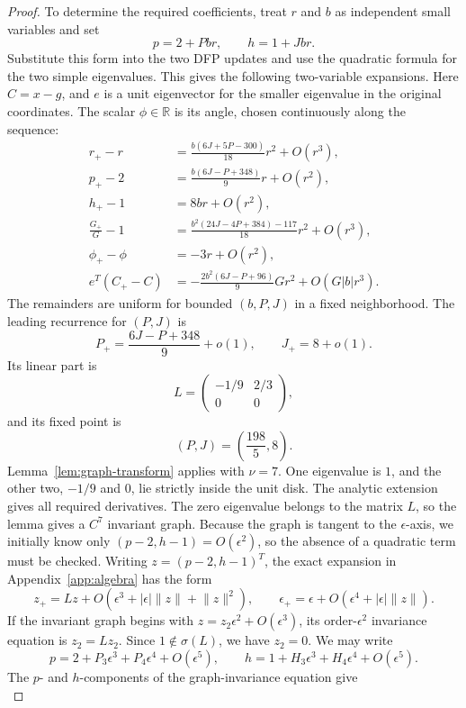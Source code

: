 \documentclass[11pt]{article}
\newcommand{\R}{\mathbb R}
\newcommand{\norm}[1]{\lVert #1\rVert}
\begin{document}
\begin{proof}
To determine the required coefficients, treat $r$ and $b$ as independent
small variables and set
\[
p=2+Pb r,\qquad h=1+Jb r.
\]
Substitute this form into the two DFP updates and use the quadratic formula for
the two simple eigenvalues.  This gives the following two-variable expansions.
Here $C=x-g$, and $e$ is a unit eigenvector for the smaller eigenvalue in the
original coordinates.  The scalar $\phi\in\R$ is its angle, chosen continuously
along the sequence:
\begin{align*}
r_+-r
 &=\frac{b(6J+5P-300)}{18}r^2+O(r^3),\\
p_+-2
 &=\frac{b(6J-P+348)}9r+O(r^2),\\
h_+-1&=8br+O(r^2),\\
\frac{G_+}{G}-1
 &=\frac{b^2(24J-4P+384)-117}{18}r^2+O(r^3),\\
\phi_+-\phi&=-3r+O(r^2),\\
e^T(C_+-C)
 &=-\frac{2b^2(6J-P+96)}9Gr^2+O(G|b|r^3).
\end{align*}
The remainders are uniform for bounded $(b,P,J)$ in a fixed neighborhood.
The leading recurrence for $(P,J)$ is
\begin{equation}\label{eq:transverse-map}
P_+=\frac{6J-P+348}{9}+o(1),
\qquad J_+=8+o(1).
\end{equation}
Its linear part is
\[
L=\begin{pmatrix}-1/9&2/3\\0&0\end{pmatrix},
\]
and its fixed point is
\[
(P,J)=\left(\frac{198}{5},8\right).
\]
Lemma~\ref{lem:graph-transform} applies with $\nu=7$.  One eigenvalue is $1$,
and the other two, $-1/9$ and $0$, lie strictly inside the unit disk.  The
analytic extension gives all required derivatives.  The zero eigenvalue
belongs to the matrix $L$, so the lemma gives a $C^7$ invariant graph.
Because the graph is tangent to the $\epsilon$-axis, we initially know only
$(p-2,h-1)=O(\epsilon^2)$, so the absence of a quadratic term must be checked.
Writing $z=(p-2,h-1)^T$, the exact expansion in
Appendix~\ref{app:algebra} has the form
\[
z_+=Lz+O(\epsilon^3+|\epsilon|\norm{z}+\norm{z}^2),
\qquad \epsilon_+=\epsilon+O(\epsilon^4+|\epsilon|\norm{z}).
\]
If the invariant graph begins with $z=z_2\epsilon^2+O(\epsilon^3)$, its
order-$\epsilon^2$ invariance equation is $z_2=Lz_2$.  Since
$1\notin\sigma(L)$, we have $z_2=0$.  We may write
\[
p=2+P_3\epsilon^3+P_4\epsilon^4+O(\epsilon^5),
\qquad
h=1+H_3\epsilon^3+H_4\epsilon^4+O(\epsilon^5).
\]
The $p$- and $h$-components of the graph-invariance equation give
\begin{equation}\label{eq:graph-coefficient-system}

\end{equation}
\end{proof}
\end{document}
